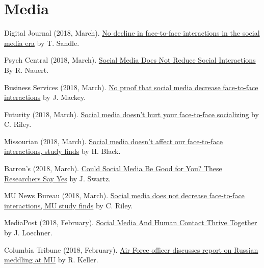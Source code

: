\section{Media}
  \begin{bibenum}
    \item[] Digital Journal (2018, March).
      \href{http://www.digitaljournal.com/tech-and-science/technology/no-decline-in-face-to-face-interactions-in-the-social-media-era/article/516359}{No decline in face-to-face interactions in the social media era} by T. Sandle.
    \item[] Psych Central (2018, March).
      \href{https://psychcentral.com/news/2018/03/02/social-media-does-not-reduce-social-interactions/133209.html}{Social Media Does Not Reduce Social Interactions} By R. Nauert.
    \item[] Business Services (2018, March).
      \href{http://businessservices24.com/44/no-proof-that-social-media-decrease-face-to-face-interactions/}{No proof that social media decrease face-to-face interactions} by J. Mackey.
    \item[] Futurity (2018, March).
      \href{http://www.futurity.org/social-media-social-interactions-1692872/}{Social media doesn’t hurt your face-to-face socializing} by C. Riley.
    \item[] Missourian (2018, March).
      \href{https://www.columbiamissourian.com/news/higher_education/social-media-doesn-t-affect-our-face-to-face-interactions/article_7f2643a2-1e4e-11e8-8fe8-079f195a6de9.html}{Social media doesn't affect our face-to-face interactions, study finds} by H. Black.
    \item[] Barron's (2018, March).
      \href{https://www.barrons.com/articles/could-social-media-be-good-for-you-these-researchers-say-yes-1519932207}{Could Social Media Be Good for You? These Researchers Say Yes} by J. Swartz.
    \item[] MU News Bureau (2018, March).
      \href{https://munews.missouri.edu/news-releases/2018/0301-social-media-does-not-decrease-face-to-face-interactions-mu-study-finds/}{Social media does not decrease face-to-face interactions, MU study finds} by C. Riley.
    \item[] MediaPost (2018, February).
      \href{https://mediapost.com/publications/article/315106/social-media-and-human-contact-thrive-together.html}{Social Media And Human Contact Thrive Together} by J. Loechner.
    \item[] Columbia Tribune (2018, February).
      \href{http://www.columbiatribune.com/news/20180217/air-force-officer-discusses-report-on-russian-meddling-at-mu}{Air Force officer discusses report on Russian meddling at MU} by R. Keller.

\end{bibenum}
